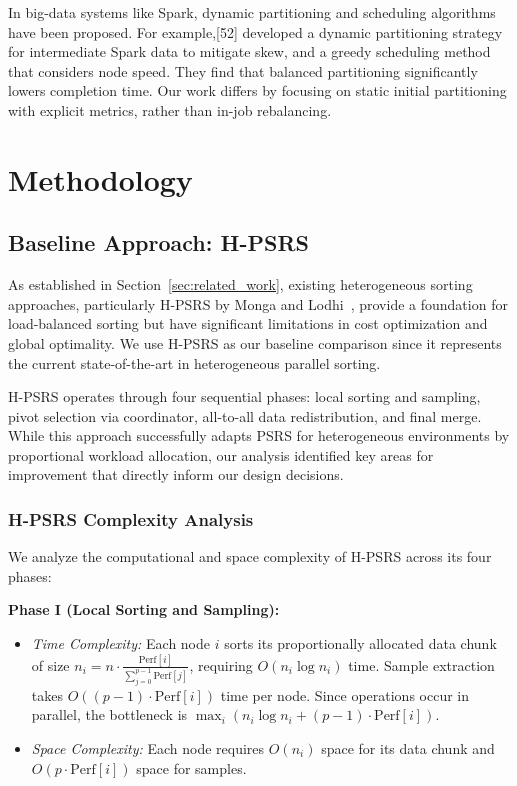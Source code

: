 \documentclass[]{interact}
\theoremstyle{plain}
\theoremstyle{definition}
\theoremstyle{remark}
\begin{document}
In big-data systems like Spark, dynamic partitioning and scheduling algorithms have been proposed. For example,[52] developed a dynamic partitioning strategy for intermediate Spark data to mitigate skew, and a greedy scheduling method that considers node speed. They find that balanced partitioning significantly lowers completion time. Our work differs by focusing on static initial partitioning with explicit metrics, rather than in-job rebalancing.

\section{Methodology}

\subsection{Baseline Approach: H-PSRS}
\label{sec:baseline}

As established in Section~\ref{sec:related_work}, existing heterogeneous sorting approaches, particularly H-PSRS by Monga and Lodhi~\cite{monga_lodhi}, provide a foundation for load-balanced sorting but have significant limitations in cost optimization and global optimality. We use H-PSRS as our baseline comparison since it represents the current state-of-the-art in heterogeneous parallel sorting.

H-PSRS operates through four sequential phases: local sorting and sampling, pivot selection via coordinator, all-to-all data redistribution, and final merge. While this approach successfully adapts PSRS for heterogeneous environments by proportional workload allocation, our analysis identified key areas for improvement that directly inform our design decisions.

\subsubsection{H-PSRS Complexity Analysis}

We analyze the computational and space complexity of H-PSRS across its four phases:

\textbf{Phase I (Local Sorting and Sampling):}
\begin{itemize}
\item \textit{Time Complexity:} Each node $i$ sorts its proportionally allocated data chunk of size $n_i = n \cdot \frac{\text{Perf}[i]}{\sum_{j=0}^{p-1} \text{Perf}[j]}$, requiring $O(n_i \log n_i)$ time. Sample extraction takes $O((p-1) \cdot \text{Perf}[i])$ time per node. Since operations occur in parallel, the bottleneck is $\max_i(n_i \log n_i + (p-1) \cdot \text{Perf}[i])$.
\item \textit{Space Complexity:} Each node requires $O(n_i)$ space for its data chunk and $O(p \cdot \text{Perf}[i])$ space for samples.
\end{itemize}
\end{document}

